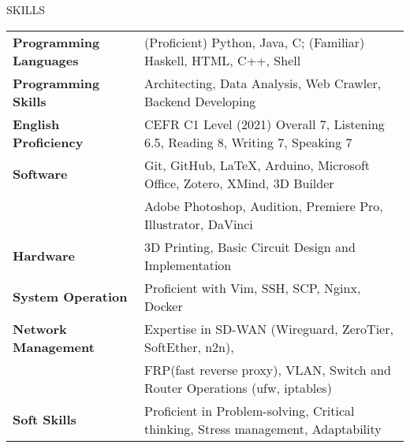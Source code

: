 \documentclass{resume} %
\begin{document}
\begin{rSection}{SKILLS}

    \begin{tabular}{ @{} >{\bfseries}l @{\hspace{6ex}} l }
    Programming Languages & (Proficient) Python, Java, C; (Familiar) Haskell, HTML, C++, Shell
    \\
    Programming Skills & Architecting, Data Analysis, Web Crawler, Backend Developing
    \\
    English Proficiency & CEFR C1 Level (2021) Overall 7, Listening 6.5, Reading 8, Writing 7, Speaking 7
    \\
    Software & Git, GitHub, \LaTeX, Arduino, Microsoft Office, Zotero, XMind, 3D Builder \\
    & Adobe Photoshop, Audition, Premiere Pro, Illustrator, DaVinci
    \\
    Hardware & 3D Printing, Basic Circuit Design and Implementation
    \\
    System Operation & Proficient with Vim, SSH, SCP, Nginx, Docker
    \\
    Network Management & Expertise in SD-WAN (Wireguard, ZeroTier, SoftEther, n2n), \\ 
    & FRP(fast reverse proxy), VLAN, Switch and Router Operations (ufw, iptables)\\
    Soft Skills & Proficient in Problem-solving, Critical thinking, Stress management, Adaptability
    \end{tabular}
\end{rSection}
    
\end{document}
